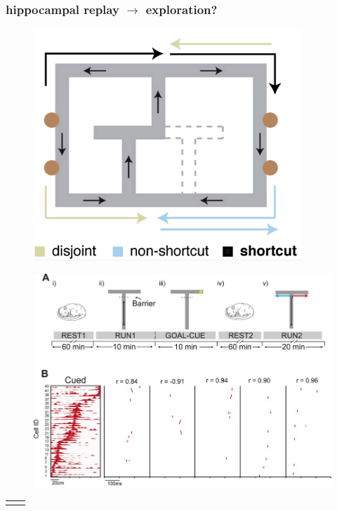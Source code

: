 \documentclass[aspectratio=169]{beamer}
\begin{document}
\begin{frame}
    \frametitle{hippocampal replay $\rightarrow$ exploration?}
    \begin{minipage}[t]{0.5\textwidth}
        \begin{figure}
            \centering
            \includegraphics[width=0.9\textwidth]{replay_shortcut.png}
        \end{figure}
    \end{minipage}%
    \begin{minipage}[t]{0.5\textwidth}
        \begin{figure}
            \centering
            \includegraphics[width=1\textwidth]{replay_preplay.png}
        \end{figure}
    \end{minipage}
    \bigbreak
    \begin{tabular}{p{}p{}}
        \centering \citet{guptaHippocampalReplayNot2010} & \centering \citet{olafsdottirHippocampalPlaceCells2015}
    \end{tabular}
\end{frame}
\end{document}
